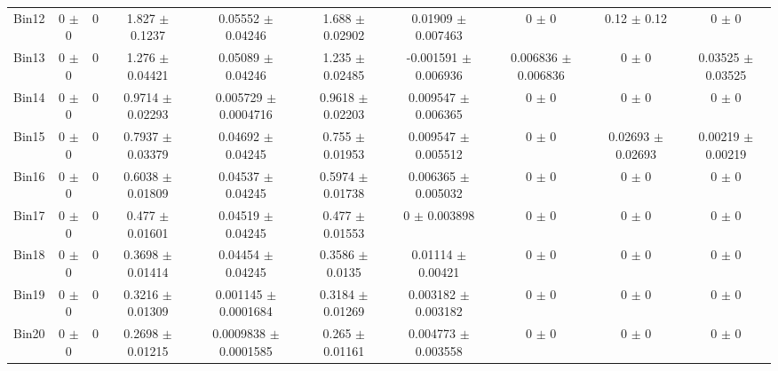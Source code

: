 \begin{tabular}{@{\extracolsep{4pt}}lccccccccc@{}}
     Bin12 & 0 $\pm$ 0 & 0 & 1.827 $\pm$ 0.1237 & 0.05552 $\pm$ 0.04246 & 1.688 $\pm$ 0.02902 & 0.01909 $\pm$ 0.007463 & 0 $\pm$ 0 & 0.12 $\pm$ 0.12 & 0 $\pm$ 0 \\ 
     Bin13 & 0 $\pm$ 0 & 0 & 1.276 $\pm$ 0.04421 & 0.05089 $\pm$ 0.04246 & 1.235 $\pm$ 0.02485 & -0.001591 $\pm$ 0.006936 & 0.006836 $\pm$ 0.006836 & 0 $\pm$ 0 & 0.03525 $\pm$ 0.03525 \\ 
     Bin14 & 0 $\pm$ 0 & 0 & 0.9714 $\pm$ 0.02293 & 0.005729 $\pm$ 0.0004716 & 0.9618 $\pm$ 0.02203 & 0.009547 $\pm$ 0.006365 & 0 $\pm$ 0 & 0 $\pm$ 0 & 0 $\pm$ 0 \\ 
     Bin15 & 0 $\pm$ 0 & 0 & 0.7937 $\pm$ 0.03379 & 0.04692 $\pm$ 0.04245 & 0.755 $\pm$ 0.01953 & 0.009547 $\pm$ 0.005512 & 0 $\pm$ 0 & 0.02693 $\pm$ 0.02693 & 0.00219 $\pm$ 0.00219 \\ 
     Bin16 & 0 $\pm$ 0 & 0 & 0.6038 $\pm$ 0.01809 & 0.04537 $\pm$ 0.04245 & 0.5974 $\pm$ 0.01738 & 0.006365 $\pm$ 0.005032 & 0 $\pm$ 0 & 0 $\pm$ 0 & 0 $\pm$ 0 \\ 
     Bin17 & 0 $\pm$ 0 & 0 & 0.477 $\pm$ 0.01601 & 0.04519 $\pm$ 0.04245 & 0.477 $\pm$ 0.01553 & 0 $\pm$ 0.003898 & 0 $\pm$ 0 & 0 $\pm$ 0 & 0 $\pm$ 0 \\ 
     Bin18 & 0 $\pm$ 0 & 0 & 0.3698 $\pm$ 0.01414 & 0.04454 $\pm$ 0.04245 & 0.3586 $\pm$ 0.0135 & 0.01114 $\pm$ 0.00421 & 0 $\pm$ 0 & 0 $\pm$ 0 & 0 $\pm$ 0 \\ 
     Bin19 & 0 $\pm$ 0 & 0 & 0.3216 $\pm$ 0.01309 & 0.001145 $\pm$ 0.0001684 & 0.3184 $\pm$ 0.01269 & 0.003182 $\pm$ 0.003182 & 0 $\pm$ 0 & 0 $\pm$ 0 & 0 $\pm$ 0 \\ 
     Bin20 & 0 $\pm$ 0 & 0 & 0.2698 $\pm$ 0.01215 & 0.0009838 $\pm$ 0.0001585 & 0.265 $\pm$ 0.01161 & 0.004773 $\pm$ 0.003558 & 0 $\pm$ 0 & 0 $\pm$ 0 & 0 $\pm$ 0 \\ 
\hline\hline
  \end{tabular}
